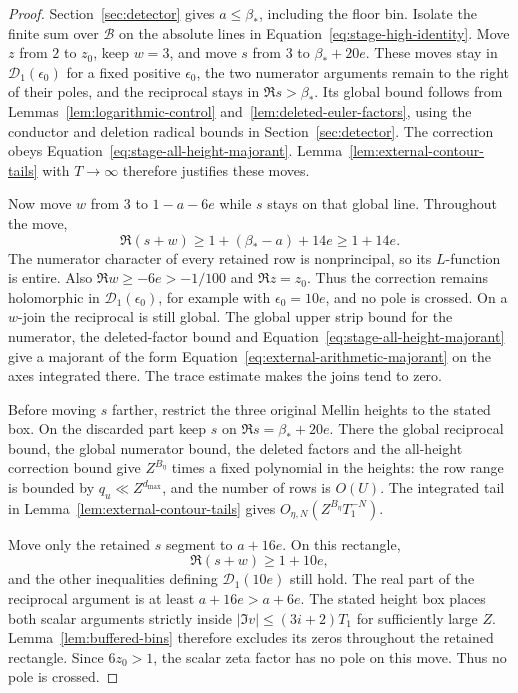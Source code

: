 \documentclass[11pt,a4paper]{article}
\numberwithin{equation}{section}
\numberwithin{figure}{section}
\theoremstyle{definition}
\theoremstyle{remark}
\begin{document}
\begin{proof}

Section~\ref{sec:detector} gives $a\le\beta_*$, including the floor bin.
Isolate the finite sum over $\mathcal B$
on the absolute lines in Equation~\eqref{eq:stage-high-identity}.  Move
$z$ from $2$ to $z_0$, keep $w=3$, and move $s$ from $3$ to
$\beta_*+20e$.  These moves stay in $\mathcal D_1(\epsilon_0)$ for a fixed
positive $\epsilon_0$, the two numerator arguments remain to the right
of their poles, and the reciprocal stays in $\Re s>\beta_*$.  Its global
bound follows from Lemmas~\ref{lem:logarithmic-control}
and~\ref{lem:deleted-euler-factors}, using the conductor and deletion
radical bounds in Section~\ref{sec:detector}.  The correction obeys
Equation~\eqref{eq:stage-all-height-majorant}.  Lemma~\ref{lem:external-contour-tails}
with $T\to\infty$ therefore justifies these moves.

Now move $w$ from $3$ to $1-a-6e$ while $s$ stays on that global line.
Throughout the move,
\[
 \Re(s+w)\ge1+(\beta_*-a)+14e\ge1+14e.
\]
The numerator character of every retained row is nonprincipal, so its
$L$-function is entire.  Also $\Re w\ge-6e>-1/100$ and
$\Re z=z_0$.  Thus the correction remains holomorphic in
$\mathcal D_1(\epsilon_0)$, for example with $\epsilon_0=10e$, and no
pole is crossed.  On a $w$-join the reciprocal is still global.  The
global upper strip bound for the numerator, the deleted-factor bound and
Equation~\eqref{eq:stage-all-height-majorant} give a majorant of the form
Equation~\eqref{eq:external-arithmetic-majorant} on the axes integrated
there.  The trace estimate makes the joins tend to zero.

Before moving $s$ farther, restrict the three original Mellin heights to the stated box.  On the discarded
part keep $s$ on $\Re s=\beta_*+20e$.  There the global reciprocal bound,
the global numerator bound, the deleted factors and the all-height
correction bound give $Z^{B_\eta}$ times a fixed polynomial in the heights:
the row range is bounded by $q_u\ll Z^{d_{\max}}$, and the number of rows
is $O(U)$.  The integrated tail in
Lemma~\ref{lem:external-contour-tails} gives
$O_{\eta,N}(Z^{B_\eta}T_1^{-N})$.

Move only the retained $s$ segment to $a+16e$.  On this rectangle,
\[
 \Re(s+w)\ge1+10e,
\]
and the other inequalities defining $\mathcal D_1(10e)$ still hold.
The real part of the reciprocal argument is at least $a+16e>a+6e$.
The stated height box places both scalar arguments
strictly inside $|\Im v|\le(3i+2)T_1$ for sufficiently large $Z$.
Lemma~\ref{lem:buffered-bins} therefore excludes its zeros throughout
the retained rectangle.  Since $6z_0>1$, the scalar zeta factor has no
pole on this move.  Thus no pole is crossed.


\end{proof}
\end{document}
